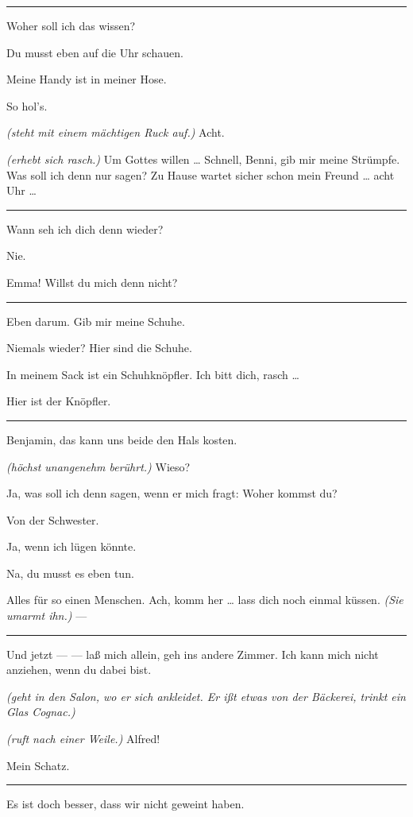 \documentclass[
	final,
	a4paper,
	ngerman,
	mpinclude = true, %
	twoside = true,
	open = right,
	cleardoublepage = plain,
	DIV = 13,
	BCOR = 1cm,
	titlepage = firstiscover,
	]{scrbook}
\newcommand{\direction}[1]{\textit{(#1)}}
\newenvironment{deletion}{%
		\vspace{0.25\baselineskip}
		\hrule
		\vspace{0.25\baselineskip}
		\color{darkgray}
	}{
		\color{black}
		\vspace{0.25\baselineskip}
		\hrule 
		\vspace{0.25\baselineskip}
	}
\newcommand{\thecharacter}[1]{\textup{\textsc{#1}}\xspace}
\newcommand{\theherr}{\thecharacter{Benjamin}}
\newcommand{\thefrau}{\thecharacter{Emma}}
\newcommand{\character}[1]{\item[#1:]}
\newcommand{\herr}{\character{\theherr}}
\newcommand{\frau}{\character{\thefrau}}
\begin{document}
\begin{play}
\begin{deletion}
	\herr
	Woher soll ich das wissen?

	\frau
	Du musst eben auf die Uhr schauen.

	\herr
	Meine Handy ist in meiner Hose.

	\frau
	So hol's.

	\herr
	\direction{steht mit einem mächtigen Ruck auf.} Acht.

	\frau
	\direction{erhebt sich rasch.} Um Gottes willen \ldots{} Schnell, Benni, gib mir meine Strümpfe. Was soll ich denn nur sagen? Zu Hause wartet sicher schon mein Freund \ldots{} acht Uhr \ldots{}
	\end{deletion}

	\herr
	Wann seh ich dich denn wieder?

	\frau
	Nie.

	\herr
	Emma! Willst du mich denn nicht?

	\begin{deletion}
	\frau
	Eben darum. Gib mir meine Schuhe.

	\herr
	Niemals wieder? Hier sind die Schuhe.

	\frau
	In meinem Sack ist ein Schuhknöpfler. Ich bitt dich, rasch \ldots{}

	\herr
	Hier ist der Knöpfler.
	\end{deletion}

	\frau
	Benjamin, das kann uns beide den Hals kosten.

	\herr
	\direction{höchst unangenehm berührt.} Wieso?

	\frau
	Ja, was soll ich denn sagen, wenn er mich fragt: Woher kommst du?

	\herr
	Von der Schwester.

	\frau
	Ja, wenn ich lügen könnte.

	\herr
	Na, du musst es eben tun.

	\frau
	Alles für so einen Menschen. Ach, komm her \ldots{} lass dich noch einmal küssen. \direction{Sie umarmt ihn.} ---
	\begin{deletion}
	Und jetzt --- --- laß mich allein, geh ins andere Zimmer. Ich kann mich nicht anziehen, wenn du dabei bist.

	\herr
	\direction{geht in den Salon, wo er sich ankleidet. Er ißt etwas von der Bäckerei, trinkt ein Glas Cognac.}

	\frau
	\direction{ruft nach einer Weile.} Alfred!

	\herr
	Mein Schatz.

	\end{deletion}
	\frau
	Es ist doch besser, dass wir nicht geweint haben.


\end{play}
\end{document}
